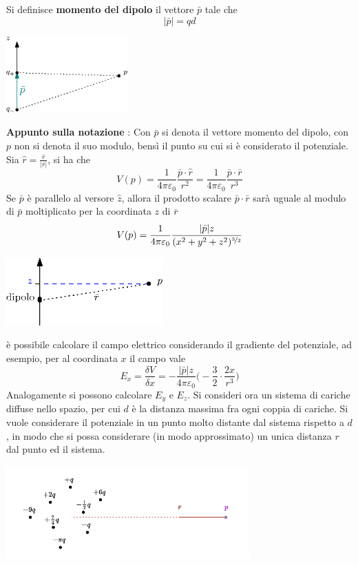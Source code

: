 \documentclass[10pt, letterpaper]{report}
\begin{document}
Si definisce \textbf{momento del dipolo} il vettore $\bar p$ tale che $$ |\bar p|=qd$$
\begin{center}
    \includegraphics[width=0.35\textwidth]{images/momentoDipolo.eps}
\end{center} 
\textbf{Appunto sulla notazione} : Con $\bar p$ si denota il vettore momento del dipolo, con $p$ non si denota il suo modulo, bensì il punto su cui si è considerato il potenziale.\acc
Sia $\hat r = \frac{\bar r}{|\bar r|}$, si ha che 
$$V(p)=\frac{1}{4\pi \varepsilon_0} \frac{\bar p \cdot \hat r}{r^2}= 
\frac{1}{4\pi \varepsilon_0} \frac{\bar p \cdot \bar  r}{r^3}$$
Se $\bar p$ è parallelo al versore $\hat z$, allora il prodotto scalare $\bar p \cdot \bar r$ sarà uguale al modulo di $\bar p$ moltiplicato per la coordinata $z$ di $\bar r$ 
$$V(p)=\frac{1}{4\pi \varepsilon_0} \frac{|\bar p|z}{(x^2+y^2+z^2)^{\nicefrac{3}{2}}}$$
\begin{center}
    \includegraphics[width=0.45\textwidth]{images/MomentoDipolo2.eps}
\end{center} 
è possibile calcolare il campo elettrico considerando il gradiente del potenziale, ad esempio, per al coordinata $x$ il campo vale 
$$ E_x=\frac{\delta V}{\delta x}= 
-\frac{|\bar p|z}{4\pi\varepsilon_0}\Big( -\frac{3}{2}\cdot \frac{2x}{r^3} \Big)
$$
Analogamente si possono calcolare $E_y$ e $E_z$.\acc 
Si consideri ora un sistema di cariche diffuse nello spazio, per cui $d$ è la distanza massima fra ogni coppia di cariche. Si vuole considerare il potenziale in un punto molto distante dal sistema rispetto a $d$, in modo che si possa considerare (in modo approssimato) un unica distanza $r$ dal punto ed il sistema. 
\begin{center}
    \includegraphics[width=0.7\textwidth]{images/sistemaCariche.pdf}
\end{center} 
\end{document}

